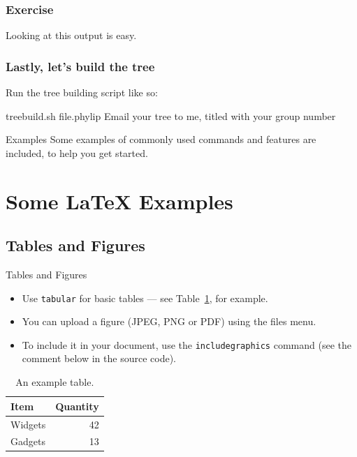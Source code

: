 \documentclass{beamer}
\begin{document}
\begin{frame}
\frametitle{Exercise}
Looking at this output is easy.
\end{frame}

\begin{frame}
\frametitle{Lastly, let's build the tree}
Run the tree building script like so:

treebuild.sh file.phylip
Email your tree to me, titled with your group number
\end{frame}


\vskip 1cm
\begin{frame}
\begin{block}{Examples}
Some examples of commonly used commands and features are included, to help you get started.
\end{block}
\end{frame}

\section{Some \LaTeX{} Examples}

\subsection{Tables and Figures}

\begin{frame}{Tables and Figures}

\begin{itemize}
\item Use \texttt{tabular} for basic tables --- see Table~\ref{tab:widgets}, for example.
\item You can upload a figure (JPEG, PNG or PDF) using the files menu. 
\item To include it in your document, use the \texttt{includegraphics} command (see the comment below in the source code).
\end{itemize}


\begin{table}
\centering
\begin{tabular}{l|r}
Item & Quantity \\\hline
Widgets & 42 \\
Gadgets & 13
\end{tabular}
\caption{\label{tab:widgets}An example table.}
\end{table}

\end{frame}
\end{document}
